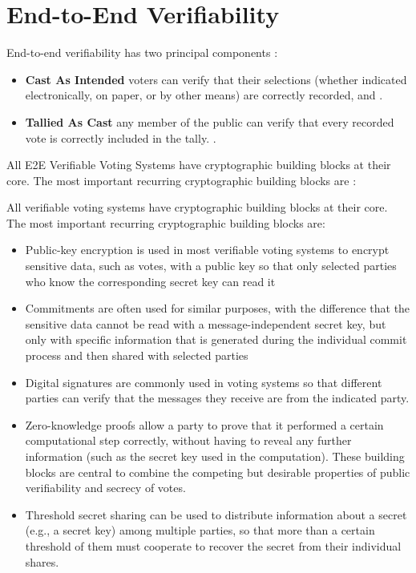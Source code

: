 \section{End-to-End Verifiability}

End-to-end verifiability has two principal components \cite[2]{e2e-primer}:
\begin{itemize}
    \item \textbf{Cast As Intended} voters can verify that their selections (whether indicated electronically, on
    paper, or by other means) are correctly recorded, and \cite[2]{e2e-primer}.
    \item \textbf{Tallied As Cast} any member of the public can verify that every recorded vote is correctly
    included in the tally. \cite[2]{e2e-primer}.
\end{itemize}

All E2E Verifiable Voting Systems have cryptographic building blocks at their core. The most important recurring cryptographic building blocks are \cite[13]{stuve-studys}:

All verifiable voting systems have cryptographic building blocks at their core. The most important recurring cryptographic building blocks are:
\begin{itemize}
    \item Public-key encryption is used in most verifiable voting systems to encrypt sensitive data, such as votes, with a public key so that only selected parties who know the corresponding secret key can read it
    \item Commitments are often used for similar purposes, with the difference that the sensitive data cannot be read with a message-independent secret key, but only with specific information that is generated during the individual commit process and then shared with selected parties
    \item Digital signatures are commonly used in voting systems so that different parties 
    can verify that the messages they receive are from the indicated party.
    \item Zero-knowledge proofs allow a party to prove that it performed a certain computational step correctly, without having to reveal any further information (such as the secret key used in the computation). These building blocks are central to combine the competing but desirable properties of public verifiability and secrecy of votes.
    \item Threshold secret sharing can be used to distribute information about a secret (e.g., a secret key) among multiple parties, so that more than a certain threshold of them must cooperate to recover the secret from their individual shares.
\end{itemize}

